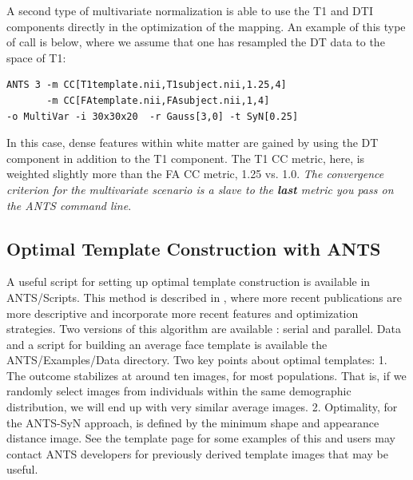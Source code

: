 \documentclass{InsightArticle}
\begin{document}
A second type of multivariate normalization is able to use the T1 and DTI components 
directly in the optimization of the mapping.  An example of this type of call is below, 
where we assume that one has resampled the DT data to the space of T1: 
\begin{verbatim}
ANTS 3 -m CC[T1template.nii,T1subject.nii,1.25,4]
       -m CC[FAtemplate.nii,FAsubject.nii,1,4] 
-o MultiVar -i 30x30x20  -r Gauss[3,0] -t SyN[0.25]
\end{verbatim}
In this case, dense features within white matter are gained by using the DT component  
in addition to the T1 component.   The T1 CC metric, here, is weighted slightly more 
than the FA CC metric, 1.25 vs. 1.0.  {\em The convergence criterion for 
the multivariate scenario is a slave to the {\bf last} metric you 
pass on the ANTS command line}.

\subsection{Optimal Template Construction with ANTS}
A useful script for setting up optimal template construction
 is available in ANTS/Scripts.  This method is described in \cite{Avants2004,Avants2006d,Kim2008,Yushkevich2009,Avants2009c}, 
where more recent publications are more descriptive and incorporate 
more recent features and optimization strategies. 
Two versions of this algorithm are available : serial and parallel.  
Data and a script for building an average face template is available 
the ANTS/Examples/Data directory.  Two key points about optimal templates:
1. The outcome stabilizes at around ten images, for most populations.
That is, if we randomly select images from individuals within the same 
demographic distribution, we will end up with very similar average images.  
2.  Optimality, for the ANTS-SyN approach, is defined by the minimum shape 
and appearance distance image. 
See the template page for some examples of this and users may 
contact ANTS developers for previously derived template 
images that may be useful. 
\end{document}
